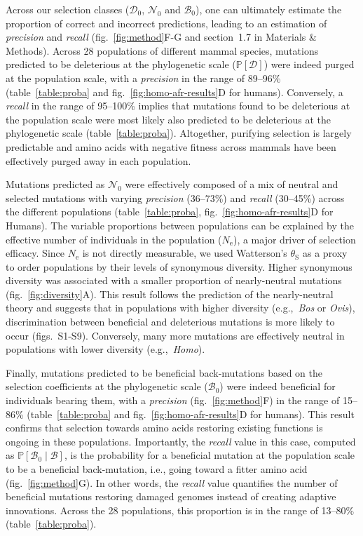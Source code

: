 \documentclass[12pt]{article}
\newcommand{\Ne}{N_{\text{e}}}
\newcommand{\proba}{\mathbb{P}}
\newcommand{\SphyDel}{\mathcal{D}_0}
\newcommand{\SphyNeu}{\mathcal{N}_0}
\newcommand{\SphyBen}{\mathcal{B}_0}
\newcommand{\given}{\mid}
\newcommand{\SpopDel}{\mathcal{D}}
\newcommand{\SpopBen}{\mathcal{B}}
\newcommand{\ProbaPopDel}{\proba [ \SpopDel]}
\newcommand{\thetaSyn}{\theta_{\text{S}}}
\begin{document}
Across our selection classes ($\SphyDel$, $\SphyNeu$ and $\SphyBen$), one can ultimately estimate the proportion of correct and incorrect predictions, leading to an estimation of \textit{precision} and \textit{recall} (fig.~\ref{fig:method}F-G and section~1.7 in Materials \& Methods).
Across 28 populations of different mammal species, mutations predicted to be deleterious at the phylogenetic scale ($\ProbaPopDel$) were indeed purged at the population scale, with a \textit{precision} in the range of 89--96\% (table~\ref{table:proba} and fig.~\ref{fig:homo-afr-results}D for humans).
Conversely, a \textit{recall} in the range of 95--100\% implies that mutations found to be deleterious at the population scale were most likely also predicted to be deleterious at the phylogenetic scale (table~\ref{table:proba}).
Altogether, purifying selection is largely predictable and amino acids with negative fitness across mammals have been effectively purged away in each population.

Mutations predicted as $\SphyNeu$ were effectively composed of a mix of neutral and selected mutations with varying \textit{precision} (36--73\%) and \textit{recall} (30--45\%) across the different populations (table~\ref{table:proba}, fig.~\ref{fig:homo-afr-results}D for Humans).
The variable proportions between populations can be explained by the effective number of individuals in the population ($\Ne$), a major driver of selection efficacy.
Since $\Ne$ is not directly measurable, we used Watterson's $\thetaSyn$ as a proxy to order populations by their levels of synonymous diversity.
Higher synonymous diversity was associated with a smaller proportion of nearly-neutral mutations (fig.~\ref{fig:diversity}A).
This result follows the prediction of the nearly-neutral theory and suggests that in populations with higher diversity (e.g.,~\textit{Bos} or \textit{Ovis}), discrimination between beneficial and deleterious mutations is more likely to occur (figs.~S1-S9).
Conversely, many more mutations are effectively neutral in populations with lower diversity (e.g.,~\textit{Homo}).

Finally, mutations predicted to be beneficial back-mutations based on the selection coefficients at the phylogenetic scale ($\SphyBen$) were indeed beneficial for individuals bearing them, with a \textit{precision} (fig.~\ref{fig:method}F) in the range of 15--86\% (table~\ref{table:proba} and fig.~\ref{fig:homo-afr-results}D for humans).
This result confirms that selection towards amino acids restoring existing functions is ongoing in these populations.
Importantly, the \textit{recall} value in this case, computed as $\proba [ \SphyBen  \given  \SpopBen]$, is the probability for a beneficial mutation at the population scale to be a beneficial back-mutation, i.e., going toward a fitter amino acid (fig.~\ref{fig:method}G).
In other words, the \textit{recall} value quantifies the number of beneficial mutations restoring damaged genomes instead of creating adaptive innovations.
Across the 28 populations, this proportion is in the range of 13--80\% (table~\ref{table:proba}).
\end{document}
